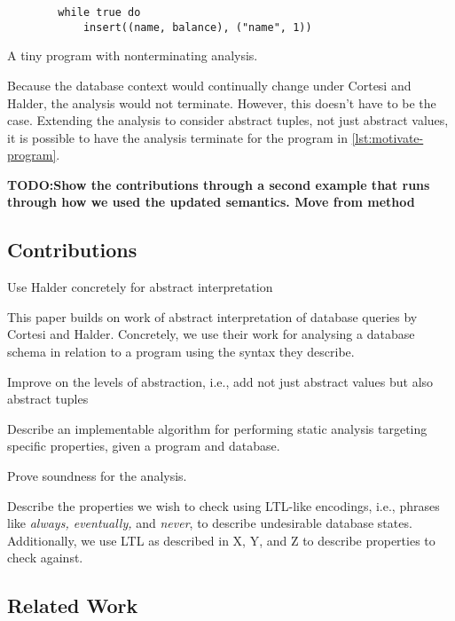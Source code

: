 \begin{listing}
    \begin{verbatim}
        while true do
            insert((name, balance), ("name", 1))
    \end{verbatim}
    \caption{A tiny program with nonterminating analysis.}
    \label{lst:motivate-program}
\end{listing}


Because the database context would continually change under Cortesi and Halder, the analysis would not terminate.
However, this doesn't have to be the case.
Extending the analysis to consider abstract tuples, not just abstract values, it is possible to have the analysis terminate for the program in \autoref{lst:motivate-program}.

\textbf{TODO:Show the contributions through a second example that runs through how we used the updated semantics. Move from method}


\subsection{Contributions}\label{subsec:contributions}

Use Halder concretely for abstract interpretation

This paper builds on work of abstract interpretation of database queries by Cortesi and Halder.
Concretely, we use their work for analysing a database schema in relation to a program using the syntax they describe.


Improve on the levels of abstraction, i.e., add not just abstract values but also abstract tuples

Describe an implementable algorithm for performing static analysis targeting specific properties, given a program and database.

Prove soundness for the analysis.


Describe the properties we wish to check using LTL-like encodings, i.e., phrases like \emph{always, eventually,} and \emph{never}, to describe undesirable database states.
Additionally, we use LTL as described in X, Y, and Z to describe properties to check against.


\subsection{Related Work}\label{subsec:related-work}

